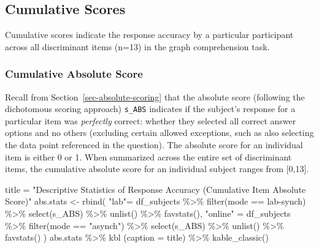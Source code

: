 \documentclass[
  letterpaper,
  DIV=11,
  numbers=noendperiod]{scrreprt}
\newenvironment{Shaded}{\begin{snugshade}}{\end{snugshade}}
\newcommand{\AttributeTok}[1]{\textcolor[rgb]{0.40,0.45,0.13}{#1}}
\newcommand{\FunctionTok}[1]{\textcolor[rgb]{0.28,0.35,0.67}{#1}}
\newcommand{\NormalTok}[1]{\textcolor[rgb]{0.00,0.23,0.31}{#1}}
\newcommand{\OtherTok}[1]{\textcolor[rgb]{0.00,0.23,0.31}{#1}}
\newcommand{\SpecialCharTok}[1]{\textcolor[rgb]{0.37,0.37,0.37}{#1}}
\newcommand{\StringTok}[1]{\textcolor[rgb]{0.13,0.47,0.30}{#1}}
\begin{document}
\hypertarget{cumulative-scores}{%
\subsection{Cumulative Scores}\label{cumulative-scores}}

Cumulative scores indicate the response accuracy by a particular
participant across all discriminant items (n=13) in the graph
comprehension task.

\hypertarget{cumulative-absolute-score}{%
\subsubsection{Cumulative Absolute
Score}\label{cumulative-absolute-score}}

Recall from Section~\ref{sec-absolute-scoring} that the absolute score
(following the dichotomous scoring approach) \texttt{s\_ABS} indicates
if the subject's response for a particular item was \emph{perfectly}
correct: whether they selected all correct answer options and no others
(excluding certain allowed exceptions, such as also selecting the data
point referenced in the question). The absolute score for an individual
item is either 0 or 1. When summarized across the entire set of
discriminant items, the cumulative absolute score for an individual
subject ranges from {[}0,13{]}.

\begin{Shaded}
\begin{Highlighting}[]
\NormalTok{title }\OtherTok{=} \StringTok{"Descriptive Statistics of Response Accuracy (Cumulative Item Absolute Score)"}
\NormalTok{abs.stats }\OtherTok{\textless{}{-}} \FunctionTok{rbind}\NormalTok{(}
  \StringTok{"lab"}\OtherTok{=}\NormalTok{ df\_subjects }\SpecialCharTok{\%\textgreater{}\%} \FunctionTok{filter}\NormalTok{(mode }\SpecialCharTok{==} \StringTok{\textquotesingle{}lab{-}synch\textquotesingle{}}\NormalTok{) }\SpecialCharTok{\%\textgreater{}\%} \FunctionTok{select}\NormalTok{(s\_ABS) }\SpecialCharTok{\%\textgreater{}\%} \FunctionTok{unlist}\NormalTok{() }\SpecialCharTok{\%\textgreater{}\%} \FunctionTok{favstats}\NormalTok{(),}
  \StringTok{"online"} \OtherTok{=}\NormalTok{ df\_subjects }\SpecialCharTok{\%\textgreater{}\%} \FunctionTok{filter}\NormalTok{(mode }\SpecialCharTok{==} \StringTok{"asynch"}\NormalTok{) }\SpecialCharTok{\%\textgreater{}\%} \FunctionTok{select}\NormalTok{(s\_ABS) }\SpecialCharTok{\%\textgreater{}\%} \FunctionTok{unlist}\NormalTok{() }\SpecialCharTok{\%\textgreater{}\%} \FunctionTok{favstats}\NormalTok{()}
\NormalTok{) }
\NormalTok{abs.stats }\SpecialCharTok{\%\textgreater{}\%} \FunctionTok{kbl}\NormalTok{ (}\AttributeTok{caption =}\NormalTok{ title) }\SpecialCharTok{\%\textgreater{}\%} \FunctionTok{kable\_classic}\NormalTok{()}
\end{Highlighting}
\end{Shaded}
\end{document}
